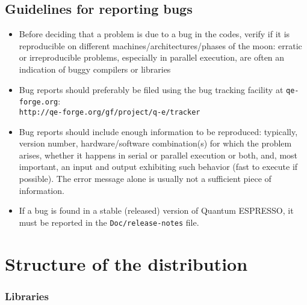 \documentclass[12pt,a4paper]{article}
\def\qe{{\sc Quantum ESPRESSO}}
\def\qeforge{\texttt{qe-forge.org}}
\begin{document}
\subsection{Guidelines for reporting bugs}
\label{SubSec:Bugs}
\begin{itemize}
\item Before deciding that a problem is due to a bug in the codes, 
verify if it is reproducible on different machines/architectures/phases 
of the moon: erratic or irreproducible problems, especially in parallel
execution, are often an indication of buggy compilers or libraries
\item Bug reports should preferably be filed using the bug tracking 
facility at \qeforge:\\
\texttt{http://qe-forge.org/gf/project/q-e/tracker}
\item Bug reports should include enough information to be reproduced: 
typically, version number, hardware/software combination(s) for which 
the problem arises, whether it happens in serial or parallel
execution or both, and, most important, an input and output
exhibiting such behavior (fast to execute if possible). The error
message alone is usually not a sufficient piece of information. 
\item If a bug is found in a stable (released) version of \qe, it must
be reported in the \texttt{Doc/release-notes} file.
\end{itemize}
\section{ Structure of the distribution}
\subsubsection{ Libraries}
\end{document}
